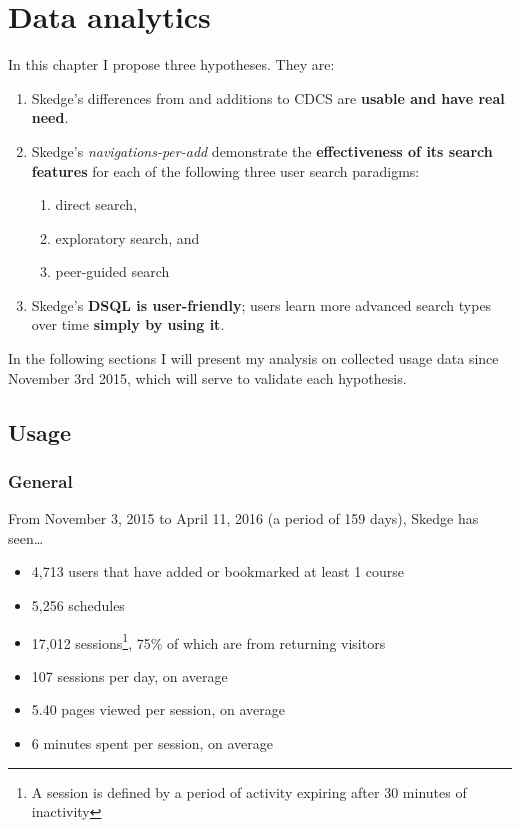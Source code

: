 
\chapter{Data analytics}

In this chapter I propose three hypotheses. They are:

\begin{enumerate}
  \item Skedge's differences from and additions to CDCS are \textbf{usable and have real need}.

  \item Skedge’s \emph{navigations-per-add} demonstrate the \textbf{effectiveness of its search features} for each of the following three user search paradigms:

  \begin{enumerate}
    \item direct search,
    \item exploratory search, and
    \item peer-guided search
  \end{enumerate}

  \item Skedge’s \textbf{DSQL is user-friendly}; users learn more advanced search types over time \textbf{simply by using it}.
\end{enumerate}

\noindent In the following sections I will present my analysis on collected usage data since November 3rd 2015, which will serve to validate each hypothesis.

\section{Usage}

\subsection{General}

From November 3, 2015 to April 11, 2016 (a period of 159 days), Skedge has seen\ldots

\begin{itemize}
  \item 4,713 users that have added or bookmarked at least 1 course
  \item 5,256 schedules
  \item 17,012 sessions\footnote{A session is defined by a period of activity expiring after 30 minutes of inactivity}, 75\% of which are from returning visitors
  \item 107 sessions per day, on average
  \item 5.40 pages viewed per session, on average 
  \item 6 minutes spent per session, on average
\end{itemize}

